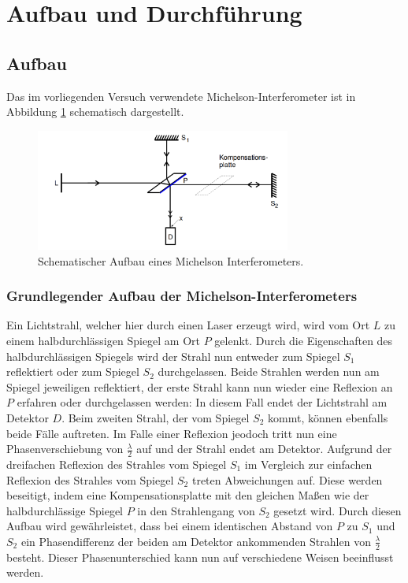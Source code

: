 \section{Aufbau und Durchführung}
\subsection{Aufbau}
\label{sec:Aufbau}

Das im vorliegenden Versuch verwendete Michelson-Interferometer ist in Abbildung \ref{abb:2} schematisch dargestellt.
\begin{figure}[H]
  \centering
  \includegraphics[height=4cm]{ressources/aufbau1.png}
  \caption{Schematischer Aufbau eines Michelson Interferometers. \cite{skript}}
  \label{abb:2}
\end{figure}

\subsubsection{Grundlegender Aufbau der Michelson-Interferometers}
Ein Lichtstrahl, welcher hier durch einen Laser erzeugt wird, wird vom Ort $L$ zu einem halbdurchlässigen Spiegel am Ort $P$ gelenkt.
Durch die Eigenschaften des halbdurchlässigen Spiegels wird der Strahl nun entweder zum Spiegel $S_1$ reflektiert oder zum Spiegel $S_2$ durchgelassen.
Beide Strahlen werden nun am Spiegel jeweiligen reflektiert, der erste Strahl kann nun wieder eine Reflexion an $P$ erfahren oder durchgelassen werden: In diesem Fall endet der Lichtstrahl am Detektor $D$.
Beim zweiten Strahl, der vom Spiegel $S_2$ kommt, können ebenfalls beide Fälle auftreten.
Im Falle einer Reflexion jeodoch tritt nun eine Phasenverschiebung von $\frac{\lambda}{2}$ auf und der Strahl endet am Detektor.
Aufgrund der dreifachen Reflexion des Strahles vom Spiegel $S_1$ im Vergleich zur einfachen Reflexion des Strahles vom Spiegel $S_2$ treten Abweichungen auf.
Diese werden beseitigt, indem eine Kompensationsplatte mit den gleichen Maßen wie der halbdurchlässige Spiegel $P$ in den Strahlengang von $S_2$ gesetzt wird.
Durch diesen Aufbau wird gewährleistet, dass bei einem identischen Abstand von $P$ zu $S_1$ und $S_2$ ein Phasendifferenz der beiden am Detektor ankommenden Strahlen von $\frac{\lambda}{2}$ besteht.
Dieser Phasenunterschied kann nun auf verschiedene Weisen beeinflusst werden.

